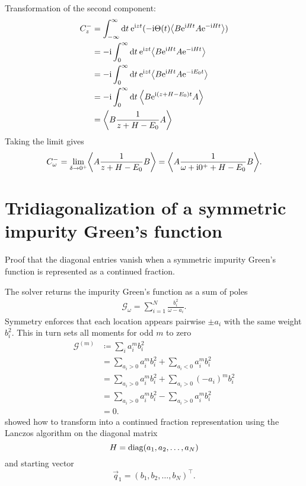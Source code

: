 Transformation of the second component:
\begin{align}
    C^-_z
     & =
    \int_{-\infty}^\infty \md t \>
    \me^{\mi zt}(-\mi \Theta(t) \expval*{B \me^{\mi Ht} A \me^{-\mi Ht}}) \\
     & =
    -\mi \int_0^\infty \md t \>
    \me^{\mi zt} \expval*{B \me^{\mi Ht} A \me^{-\mi Ht}}                 \\
     & =
    -\mi \int_0^\infty \md t \>
    \me^{\mi zt} \expval*{B \me^{\mi Ht} A \me^{-\mi E_0t}}               \\
     & =
    -\mi \int_0^\infty \md t \>
    \expval*{B \me^{\mi(z + H - E_0)t} A}                                 \\
     & =
    \expval*{B \frac{1}{z + H - E_0} A}
\end{align}
Taking the limit gives
\begin{equation}
    C^-_\omega
    =
    \lim_{\delta\to 0^+} \expval*{A \frac{1}{z + H - E_0} B}
    =
    \expval*{A \frac{1}{\omega + \mi0^+ + H - E_0} B}.
\end{equation}

\section{Tridiagonalization of a symmetric impurity Green's function}


Proof that the diagonal entries vanish when a symmetric impurity Green's function
is represented as a continued fraction.

The solver returns the impurity Green's function as a sum of poles
\begin{align}
    \mathcal{G}_{\!\omega} = \sum_{i=1}^N \frac{b_i^2}{\omega - a_i}.
    \label{eq:impurity-greens-function}
\end{align}
Symmetry enforces that each location appears pairwise $\pm a_i$
with the same weight $b_i^2$.
This in turn sets all moments for odd $m$ to zero
\begin{align}
    \mathcal{G}^{(m)}
     & \coloneqq
    \sum_i a_i^m b_i^2                                     \\
     & =
    \sum_{a_i>0} a_i^m b_i^2 + \sum_{a_i<0} a_i^m b_i^2    \\
     & =
    \sum_{a_i>0} a_i^m b_i^2 + \sum_{a_i>0} (-a_i)^m b_i^2 \\
     & =
    \sum_{a_i>0} a_i^m b_i^2 - \sum_{a_i>0} a_i^m b_i^2    \\
     & =
    0.
\end{align}
\citeauthor{Lu2014} \cite{Lu2014} showed how to transform
 into a continued fraction representation
using the Lanczos algorithm on the diagonal matrix
\begin{equation}
    H
    =
    \operatorname{diag}(a_1, a_2, \ldots, a_N)
\end{equation}
and starting vector
\begin{equation}
    \vec{q}_1 = (b_1, b_2, \ldots, b_N)^\top.
\end{equation}


